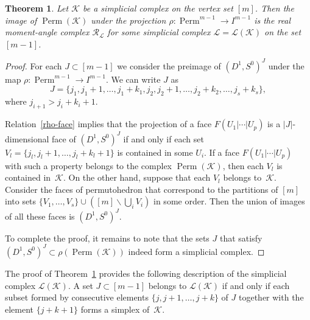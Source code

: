 \documentclass[a4paper,12pt]{amsart}
\newcommand{\K}{\mathcal K}
\newcommand{\R}{\mathcal R}
\newtheorem{theorem}[formula]{Theorem}
\theoremstyle{definition}
\theoremstyle{remark}
\numberwithin{equation}{section}
\DeclareMathOperator{\Perm}{Perm}
\begin{document}
\begin{theorem}\label{real-complex} Let $\K$ be a simplicial complex on the vertex set $[m]$. Then the image
of $\Perm(\K)$ under the projection $\rho \colon \Perm^{m-1} \to I^{m-1}$ is the real moment-angle complex $\R_\mathcal{L}$
for some simplicial complex $\mathcal{L} = \mathcal{L}(\K)$ on the set $[m-1]$.
\end{theorem}

\begin{proof}
For each $J \subset [m-1]$ we consider the preimage of $(D^1, S^0)^J$ under the map $\rho \colon \Perm^{m-1} \to I^{m-1}$.
We can write $J$ as 
\[
  J = \{j_1, j_1 + 1, \ldots, j_1+k_1, j_2, j_2 + 1, \ldots, j_2 + k_2, \ldots, 
  j_s + k_s \},
\]   
where $j_{i+1} > j_i + k_i + 1$.

Relation~\eqref{rho-face} implies that the projection of a face $F(U_1 | \cdots | U_p)$ is a $|J|$-dimensional face of $(D^1, S^0)^J$ if and only if each set
$V_l = \{j_l, j_l + 1, \ldots, j_l + k_l + 1 \}$ is contained in some $U_i$.
If a face $F(U_1 | \cdots | U_p)$ with such a property belongs to the complex $\Perm(\K)$, then each $V_l$ is contained in~$\K$.
On the other hand, suppose that each $V_l$ belongs to~$\K$. 
Consider the faces of permutohedron that correspond to the partitions of $[m]$ into sets $\{ V_1, \ldots, V_s \} \cup ([m] \backslash \bigcup_i V_i)$ in some order. 
Then the union of images of all these faces is $(D^1, S^0)^J$.

To complete the proof, it remains to note that the sets $J$ that satisfy $(D^1, S^0)^J \subset \rho(\Perm(\K))$ indeed form a simplicial complex.
\end{proof}

The proof of Theorem~\ref{real-complex} provides the following description of the simplicial complex $\mathcal{L}(\K)$. 
A set $J \subset [m-1]$ belongs to $\mathcal{L}(\K)$ if and only if each subset formed by consecutive elements $\{j, j+1, \ldots, j+k \}$ of $J$
together with the element $\{j + k + 1 \}$ forms a simplex of~$\K$.
\end{document}
